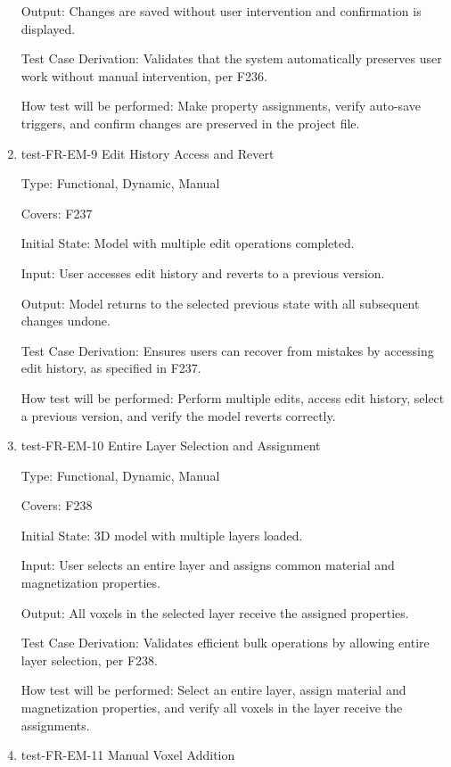 \documentclass[12pt, titlepage]{article}
\begin{document}
\begin{enumerate}
Output: Changes are saved without user intervention and confirmation is displayed.

Test Case Derivation: Validates that the system automatically preserves user work without manual intervention, per F236.
					
How test will be performed: Make property assignments, verify auto-save triggers, and confirm changes are preserved in the project file.

\item{test-FR-EM-9 Edit History Access and Revert\\}

Type: Functional, Dynamic, Manual

Covers: F237
					
Initial State: Model with multiple edit operations completed.
					
Input: User accesses edit history and reverts to a previous version.
					
Output: Model returns to the selected previous state with all subsequent changes undone.

Test Case Derivation: Ensures users can recover from mistakes by accessing edit history, as specified in F237.
					
How test will be performed: Perform multiple edits, access edit history, select a previous version, and verify the model reverts correctly.

\item{test-FR-EM-10 Entire Layer Selection and Assignment\\}

Type: Functional, Dynamic, Manual

Covers: F238
					
Initial State: 3D model with multiple layers loaded.
					
Input: User selects an entire layer and assigns common material and magnetization properties.
					
Output: All voxels in the selected layer receive the assigned properties.

Test Case Derivation: Validates efficient bulk operations by allowing entire layer selection, per F238.
					
How test will be performed: Select an entire layer, assign material and magnetization properties, and verify all voxels in the layer receive the assignments.

\item{test-FR-EM-11 Manual Voxel Addition\\}


\end{enumerate}
\end{document}
